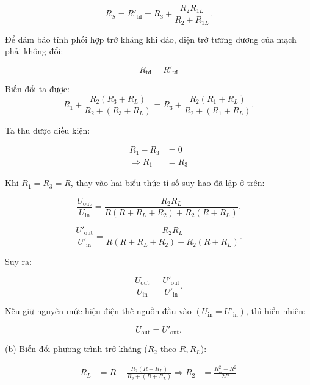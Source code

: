 \begin{equation}
      R_S=R'_{\text{tđ}}=R_3+\frac{R_2R_{1L}}{R_2+R_{1L}}.
\end{equation}

Để đảm bảo tính phối hợp trở kháng khi đảo, điện trở tương đương của mạch phải không đổi: 

\begin{equation}
    R_\text{tđ}=R'_\text{tđ}
\end{equation}

Biến đổi ta được: 
\begin{equation}
R_1+\frac{R_2(R_3+R_L)}{R_2+(R_3+R_L)}=R_3+\frac{R_2(R_1+R_L)}{R_2+(R_1+R_L)}.
\end{equation}

Ta thu được điều kiện:

\begin{equation}
    \begin{aligned}
    R_1-R_3&=0 \\    \Rightarrow R_1&=R_3
    \end{aligned}
\end{equation}

Khi $R_1=R_3=R$, thay vào hai biểu thức tỉ số suy hao đã lập ở trên:

\begin{equation}
    \frac{U_{\mathrm{out}}}{U_{\mathrm{in}}}=\frac{R_2R_L}{R(R+R_L+R_2)+R_2(R+R_L)}.
\end{equation}

\begin{equation}
    \frac{U'_{\mathrm{out}}}{U'_{\mathrm{in}}}=\frac{R_2R_L}{R(R+R_L+R_2)+R_2(R+R_L)}.
\end{equation}

Suy ra:

\begin{equation}
    \frac{U_{\mathrm{out}}}{U_{\mathrm{in}}}=\frac{U'_{\mathrm{out}}}{U'_{\mathrm{in}}}.
\end{equation}

Nếu giữ nguyên mức hiệu điện thế nguồn đầu vào $(U_{\mathrm{in}}=U'_{\mathrm{in}})$, thì hiển nhiên:

\begin{equation}
    U_{\mathrm{out}}=U'_{\mathrm{out}}.
\end{equation}

(b) Biến đổi phương trình trở kháng ($R_2$ theo $R, R_L$):

\begin{equation}
\label{eq:b1}
\begin{aligned}
    R_L
    &= R + \frac{R_2(R+R_L)}{R_2+(R+R_L)}
    \Rightarrow R_2
    &= \frac{R_L^2-R^2}{2R}
\end{aligned}
\end{equation}


